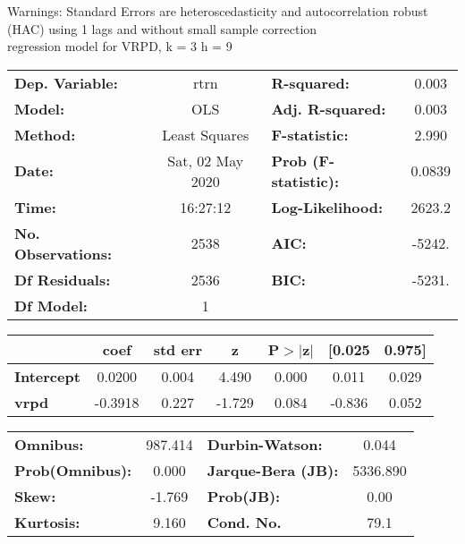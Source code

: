 Warnings: \newline
 [1] Standard Errors are heteroscedasticity and autocorrelation robust (HAC) using 1 lags and without small sample correction\\ 

regression model for VRPD, k = 3 h = 9\begin{center}
\begin{tabular}{lclc}
\toprule
\textbf{Dep. Variable:}    &       rtrn       & \textbf{  R-squared:         } &     0.003   \\
\textbf{Model:}            &       OLS        & \textbf{  Adj. R-squared:    } &     0.003   \\
\textbf{Method:}           &  Least Squares   & \textbf{  F-statistic:       } &     2.990   \\
\textbf{Date:}             & Sat, 02 May 2020 & \textbf{  Prob (F-statistic):} &   0.0839    \\
\textbf{Time:}             &     16:27:12     & \textbf{  Log-Likelihood:    } &    2623.2   \\
\textbf{No. Observations:} &        2538      & \textbf{  AIC:               } &    -5242.   \\
\textbf{Df Residuals:}     &        2536      & \textbf{  BIC:               } &    -5231.   \\
\textbf{Df Model:}         &           1      & \textbf{                     } &             \\
\bottomrule
\end{tabular}
\begin{tabular}{lcccccc}
                   & \textbf{coef} & \textbf{std err} & \textbf{z} & \textbf{P$> |$z$|$} & \textbf{[0.025} & \textbf{0.975]}  \\
\midrule
\textbf{Intercept} &       0.0200  &        0.004     &     4.490  &         0.000        &        0.011    &        0.029     \\
\textbf{vrpd}      &      -0.3918  &        0.227     &    -1.729  &         0.084        &       -0.836    &        0.052     \\
\bottomrule
\end{tabular}
\begin{tabular}{lclc}
\textbf{Omnibus:}       & 987.414 & \textbf{  Durbin-Watson:     } &    0.044  \\
\textbf{Prob(Omnibus):} &   0.000 & \textbf{  Jarque-Bera (JB):  } & 5336.890  \\
\textbf{Skew:}          &  -1.769 & \textbf{  Prob(JB):          } &     0.00  \\
\textbf{Kurtosis:}      &   9.160 & \textbf{  Cond. No.          } &     79.1  \\
\bottomrule
\end{tabular}
\end{center}

